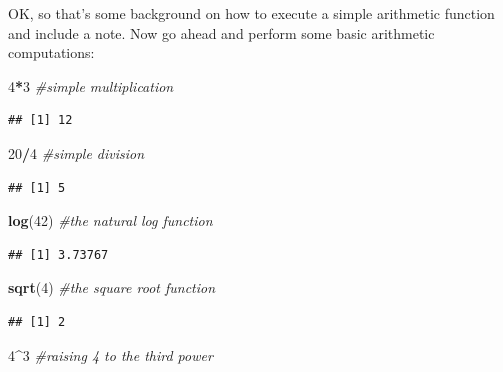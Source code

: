 \documentclass[
]{book}
\newenvironment{Shaded}{\begin{snugshade}}{\end{snugshade}}
\newcommand{\CommentTok}[1]{\textcolor[rgb]{0.56,0.35,0.01}{\textit{#1}}}
\newcommand{\DecValTok}[1]{\textcolor[rgb]{0.00,0.00,0.81}{#1}}
\newcommand{\FunctionTok}[1]{\textcolor[rgb]{0.13,0.29,0.53}{\textbf{#1}}}
\newcommand{\NormalTok}[1]{#1}
\newcommand{\SpecialCharTok}[1]{\textcolor[rgb]{0.81,0.36,0.00}{\textbf{#1}}}
\begin{document}
OK, so that's some background on how to execute a simple arithmetic function and include a note. Now go ahead and perform some basic arithmetic computations:

\begin{Shaded}
\begin{Highlighting}[]
\DecValTok{4}\SpecialCharTok{*}\DecValTok{3} \CommentTok{\#simple multiplication}
\end{Highlighting}
\end{Shaded}

\begin{verbatim}
## [1] 12
\end{verbatim}

\begin{Shaded}
\begin{Highlighting}[]
\DecValTok{20}\SpecialCharTok{/}\DecValTok{4} \CommentTok{\#simple division}
\end{Highlighting}
\end{Shaded}

\begin{verbatim}
## [1] 5
\end{verbatim}

\begin{Shaded}
\begin{Highlighting}[]
\FunctionTok{log}\NormalTok{(}\DecValTok{42}\NormalTok{) }\CommentTok{\#the natural log function}
\end{Highlighting}
\end{Shaded}

\begin{verbatim}
## [1] 3.73767
\end{verbatim}

\begin{Shaded}
\begin{Highlighting}[]
\FunctionTok{sqrt}\NormalTok{(}\DecValTok{4}\NormalTok{) }\CommentTok{\#the square root function}
\end{Highlighting}
\end{Shaded}

\begin{verbatim}
## [1] 2
\end{verbatim}

\begin{Shaded}
\begin{Highlighting}[]
\DecValTok{4}\SpecialCharTok{\^{}}\DecValTok{3} \CommentTok{\#raising 4 to the third power}
\end{Highlighting}
\end{Shaded}
\end{document}
